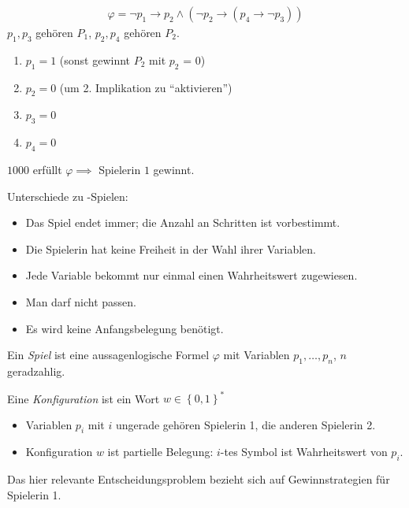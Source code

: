 \begin{tafel}
    \begin{align*}
        \varphi = \neg p_1 \rightarrow p_2 \wedge (\neg p_2 \rightarrow (p_4 \rightarrow \neg p_3))
    \end{align*}
    $p_1, p_3$ gehören $P_1$, $p_2, p_4$ gehören $P_2$.
    \begin{enumerate}
        \item $p_1 = 1$ (sonst gewinnt $P_2$ mit $p_2$ = 0)
        \item $p_2 = 0$ (um 2. Implikation zu \enquote{aktivieren})
        \item $p_3 = 0$
        \item $p_4 = 0$
    \end{enumerate}
    $1000$ erfüllt $\varphi \implies$ Spielerin $1$ gewinnt.
\end{tafel}

Unterschiede zu \ExpTime-Spielen:
\begin{itemize}
    \item Das Spiel endet immer; die Anzahl an Schritten ist vorbestimmt.
    \item Die Spielerin hat keine Freiheit in der Wahl ihrer Variablen.
    \item Jede Variable bekommt nur einmal einen Wahrheitswert zugewiesen.
    \item Man darf nicht passen.
    \item Es wird keine Anfangsbelegung benötigt.
\end{itemize}

\begin{definition}
Ein \emph{Spiel} ist eine aussagenlogische Formel $\varphi$ mit Variablen
  $p_1,\ldots,p_{n}$, $n$ geradzahlig.

  Eine \emph{Konfiguration} ist ein Wort $w \in {\left\{ 0,1 \right\}}^*$
\end{definition}

\begin{itemize}
    \item Variablen $p_i$ mit $i$ ungerade gehören Spielerin 1, die anderen Spielerin 2.
    \item Konfiguration $w$ ist partielle Belegung: $i$-tes Symbol ist Wahrheitswert von $p_i$.
\end{itemize}

Das hier relevante Entscheidungsproblem bezieht sich auf Gewinnstrategien für Spielerin 1.

